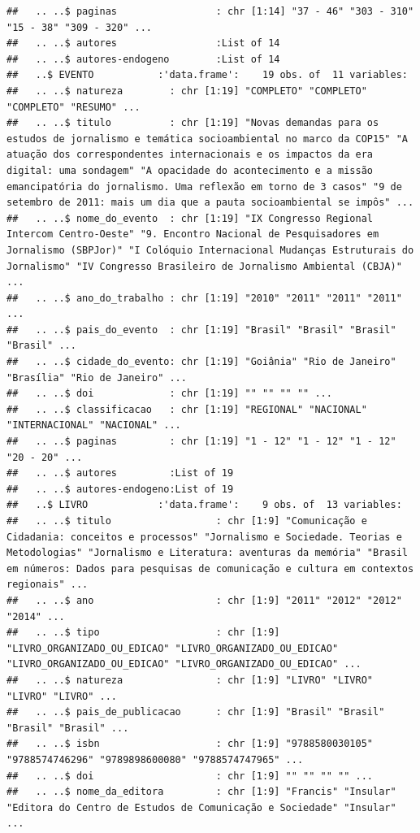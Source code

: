 \documentclass[]{article}
\begin{document}
\begin{verbatim}
##   .. ..$ paginas                 : chr [1:14] "37 - 46" "303 - 310" "15 - 38" "309 - 320" ...
##   .. ..$ autores                 :List of 14
##   .. ..$ autores-endogeno        :List of 14
##   ..$ EVENTO           :'data.frame':    19 obs. of  11 variables:
##   .. ..$ natureza        : chr [1:19] "COMPLETO" "COMPLETO" "COMPLETO" "RESUMO" ...
##   .. ..$ titulo          : chr [1:19] "Novas demandas para os estudos de jornalismo e temática socioambiental no marco da COP15" "A atuação dos correspondentes internacionais e os impactos da era digital: uma sondagem" "A opacidade do acontecimento e a missão emancipatória do jornalismo. Uma reflexão em torno de 3 casos" "9 de setembro de 2011: mais um dia que a pauta socioambiental se impôs" ...
##   .. ..$ nome_do_evento  : chr [1:19] "IX Congresso Regional Intercom Centro-Oeste" "9. Encontro Nacional de Pesquisadores em Jornalismo (SBPJor)" "I Colóquio Internacional Mudanças Estruturais do Jornalismo" "IV Congresso Brasileiro de Jornalismo Ambiental (CBJA)" ...
##   .. ..$ ano_do_trabalho : chr [1:19] "2010" "2011" "2011" "2011" ...
##   .. ..$ pais_do_evento  : chr [1:19] "Brasil" "Brasil" "Brasil" "Brasil" ...
##   .. ..$ cidade_do_evento: chr [1:19] "Goiânia" "Rio de Janeiro" "Brasília" "Rio de Janeiro" ...
##   .. ..$ doi             : chr [1:19] "" "" "" "" ...
##   .. ..$ classificacao   : chr [1:19] "REGIONAL" "NACIONAL" "INTERNACIONAL" "NACIONAL" ...
##   .. ..$ paginas         : chr [1:19] "1 - 12" "1 - 12" "1 - 12" "20 - 20" ...
##   .. ..$ autores         :List of 19
##   .. ..$ autores-endogeno:List of 19
##   ..$ LIVRO            :'data.frame':    9 obs. of  13 variables:
##   .. ..$ titulo                  : chr [1:9] "Comunicação e Cidadania: conceitos e processos" "Jornalismo e Sociedade. Teorias e Metodologias" "Jornalismo e Literatura: aventuras da memória" "Brasil em números: Dados para pesquisas de comunicação e cultura em contextos regionais" ...
##   .. ..$ ano                     : chr [1:9] "2011" "2012" "2012" "2014" ...
##   .. ..$ tipo                    : chr [1:9] "LIVRO_ORGANIZADO_OU_EDICAO" "LIVRO_ORGANIZADO_OU_EDICAO" "LIVRO_ORGANIZADO_OU_EDICAO" "LIVRO_ORGANIZADO_OU_EDICAO" ...
##   .. ..$ natureza                : chr [1:9] "LIVRO" "LIVRO" "LIVRO" "LIVRO" ...
##   .. ..$ pais_de_publicacao      : chr [1:9] "Brasil" "Brasil" "Brasil" "Brasil" ...
##   .. ..$ isbn                    : chr [1:9] "9788580030105" "9788574746296" "9789898600080" "9788574747965" ...
##   .. ..$ doi                     : chr [1:9] "" "" "" "" ...
##   .. ..$ nome_da_editora         : chr [1:9] "Francis" "Insular" "Editora do Centro de Estudos de Comunicação e Sociedade" "Insular" ...

\end{verbatim}
\end{document}
